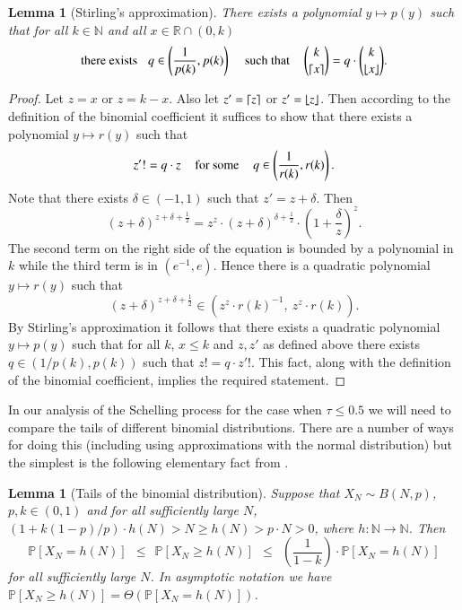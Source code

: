 \documentclass[11pt]{article}
\theoremstyle{plain}
\newtheorem{lem}[thm]{Lemma}
\numberwithin{equation}{subsection}
\newcommand{\Nat}{\mathbb{N}}
\DeclarePairedDelimiter{\floor}{\lfloor}{\rfloor}
\DeclareRobustCommand{\proba}[2][{\mbox{$\mathbb{P}$}}]{\ensuremath {#1} [ {#2} ]}
\begin{document}
\begin{lem}[Stirling's approximation]\label{le:stirlinggen}
There exists a  
polynomial $y\mapsto p(y)$ such 
that for all $k\in\Nat$ and all $x\in\mathbb{R}\cap (0, k)$
\[
\textrm{there exists}\hspace{0.3cm}
q\in \left(\frac{1}{p(k)}, p(k)\right)\hspace{0.4cm}
\textrm{such that}\hspace{0.4cm}
\binom{k}{\ceil{x}}=q\cdot \binom{k}{\floor{x}}.
\]
\end{lem}
\begin{proof}
Let $z=x$ or 
$z=k-x$. Also let  $z'=\lceil z\rceil$ or $z'=\floor{z}$.
Then according to the definition of the binomial coefficient
it suffices to show that there exists a polynomial $y\mapsto r(y)$
such that 
\[
z'!=q\cdot z\hspace{0.4cm}
\textrm{for some}\hspace{0.4cm}
q\in \left(\frac{1}{r(k)}, r(k)\right).
\]
Note that
there exists $\delta\in (-1,1)$ such that $z'=z+\delta$. Then
\[
(z+\delta)^{z+\delta+\frac{1}{2}}=z^z\cdot (z+\delta)^{\delta +\frac{1}{2}}
\cdot \left( 1+\frac{\delta}{z}\right)^z.
\]
The second term on the right side of the equation 
is bounded by a polynomial in $k$ while the third term is in
$(e^{-1}, e)$. Hence there is a quadratic polynomial $y\mapsto r(y)$ such that
\[
(z+\delta)^{z+\delta+\frac{1}{2}}\in \left(z^z\cdot r(k)^{-1},\ z^z\cdot r(k)\right). 
\]
By Stirling's approximation it follows that there exists
a quadratic polynomial $y\mapsto p(y)$ such that for all $k$, $x\leq k$ and $z, z'$ as defined above
there exists $q\in (1/p(k), p(k))$ such that
$z! = q\cdot z'!$.
This fact, along with the definition of the binomial coefficient, implies
the required statement.
\end{proof}

In our analysis of the Schelling process for the case when $\tau\leq 0.5$
we will need to compare the tails of different binomial distributions.
There are a number of ways for doing this (including using approximations with the
normal distribution) but the simplest is the following
elementary fact from \cite[Theorem 1.1]{Bollobas_random}.

\begin{lem}[Tails of the binomial distribution]\label{lem:binom}
Suppose that $X_N \sim B(N,p)$, $p,k \in (0,1)$ and
for all sufficiently large $N$,
$( 1+  k(1-p)/p )\cdot h(N)> N \geq h(N)> p\cdot N > 0$,
where
$h: \Nat \to \Nat$. Then
\[
\proba{X_N = h(N)} \ \ \leq \ \ 
\proba{X_N \geq h(N)} \ \ \leq \ \ 
\left( \frac{1}{1-k} \right) \cdot \proba{X_N = h(N)}
\]
for all sufficiently large $N$.
In asymptotic notation we have 
$\proba{X_N \geq h(N)}= \Theta \left( \proba{X_N = h(N)} \right)$.
\end{lem}
\end{document}
